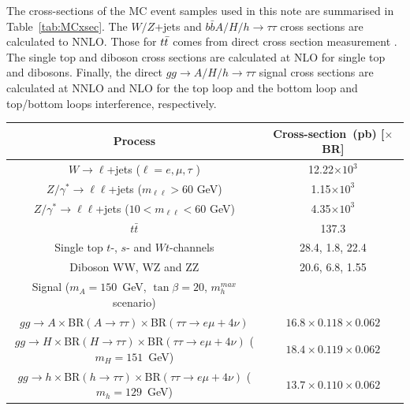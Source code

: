 The cross-sections of
the MC event samples used in this note are summarised in
Table~\ref{tab:MCxsec}. The $W/Z$+jets and $b\bar{b}A/H/h\rightarrow \tau\tau$ cross sections 
are calculated to NNLO. Those for $t\bar{t}$ comes from direct cross section measurement \cite{}. The single top and diboson cross sections are calculated at NLO for single top and dibosons. Finally, the direct $gg\rightarrow A/H/h\rightarrow \tau\tau$ signal cross sections 
are calculated at NNLO and NLO for the top loop and the bottom loop and top/bottom loops interference, respectively.


\begin{table}[tp]
\begin{center}
\begin{footnotesize}
\begin{tabular}{cc}
\hline \hline
Process                                                                 & Cross-section~(pb) [$\times$ BR] \\ \hline
$W\rightarrow \ell$+jets ($\ell=e, \mu, \tau$ )                          & 12.22$\times 10^3$ \\
$Z/\gamma^{*}\rightarrow \ell\ell$+jets ($m_{\ell\ell}>60$ GeV)      & 1.15$\times 10^3$ \\
$Z/\gamma^{*}\rightarrow \ell\ell$+jets ($10<m_{\ell\ell}<60$ GeV) & 4.35$\times 10^3$ \\
$t\bar{t}$                                                              & 137.3 \\
Single top $t$-, $s$- and $Wt$-channels                                 & 28.4, 1.8, 22.4 \\
Diboson WW, WZ and ZZ                                                  & 20.6, 6.8, 1.55 \\ \hline
Signal ($m_A=150$~GeV, $\tan\beta=20$, $m_{h}^{max}$ scenario)   &  \\ \hline
$gg\rightarrow A\times$BR$(A\rightarrow\tau\tau)\times$BR$(\tau\tau\rightarrow e\mu+ 4\nu)$                 & $ 16.8 \times 0.118 \times 0.062$ \\
$gg\rightarrow H\times$BR$(H\rightarrow\tau\tau)\times$BR$(\tau\tau\rightarrow e\mu+ 4\nu)$ ($m_H=151$~GeV) & $ 18.4 \times 0.119 \times 0.062$ \\
$gg\rightarrow h\times$BR$(h\rightarrow\tau\tau)\times$BR$(\tau\tau\rightarrow e\mu+ 4\nu)$ ($m_h=129$~GeV) & $ 13.7 \times 0.110 \times 0.062$ \\

\end{tabular}
\end{footnotesize}
\end{center}
\end{table}
